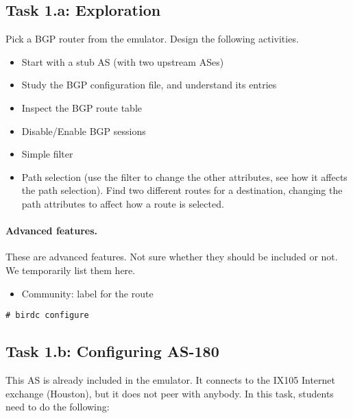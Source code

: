 \subsection{Task 1.a: Exploration} 

Pick a BGP router from the emulator. 
Design the following activities.

\begin{itemize}
  \item Start with a stub AS (with two upstream ASes)
  \item Study the BGP configuration file, and understand its entries
  \item Inspect the BGP route table 
  \item Disable/Enable BGP sessions
  \item Simple filter  
  \item Path selection (use the filter to change the other attributes,
    see how it affects the path selection). Find two different routes for 
    a destination, changing the path attributes to affect how a route 
    is selected. 
\end{itemize}


\paragraph{Advanced features.} 
These are advanced features. Not sure whether they should be included or not.
We temporarily list them here.

\begin{itemize}
  \item Community: label for the route
\end{itemize}


\begin{lstlisting}
# birdc configure 
\end{lstlisting}
 


\subsection{Task 1.b: Configuring AS-180} 

This AS is already included in the emulator. It connects to the
IX105 Internet exchange (Houston), but it does not peer with anybody. 
In this task, students need to do the following:


